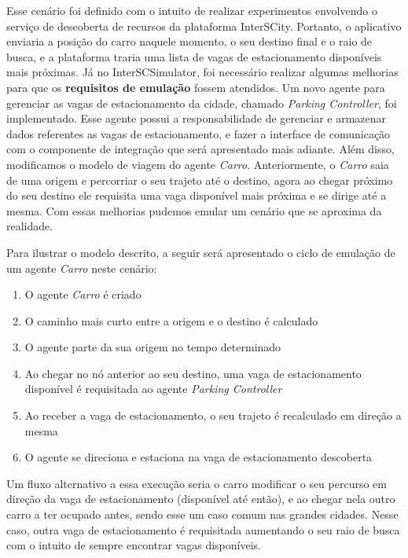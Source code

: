 Esse cenário foi definido com o intuito de realizar experimentos envolvendo o serviço de descoberta de recursos da plataforma InterSCity.
Portanto, o aplicativo enviaria a posição do carro naquele momento, o seu destino final e o raio de busca, e a plataforma traria uma lista de vagas de estacionamento
disponíveis mais próximas.
Já no InterSCSimulator, foi necessário realizar algumas melhorias para que os \textbf{requisitos de emulação} fossem atendidos.
Um novo agente para gerenciar as vagas de estacionamento da cidade, chamado \textit{Parking Controller}, foi implementado.
Esse agente possui a responsabilidade de gerenciar e armazenar dados referentes as vagas de estacionamento, e fazer a interface de comunicação com o componente de
integração que será apresentado mais adiante.
Além disso, modificamos o modelo de viagem do agente \textit{Carro}.
Anteriormente, o \textit{Carro} saia de uma origem e percorriar o seu trajeto até o destino, agora ao chegar próximo do seu destino ele requisita uma vaga disponível mais
próxima e se dirige até a mesma.
Com essas melhorias pudemos emular um cenário que se aproxima da realidade.

Para ilustrar o modelo descrito, a seguir será apresentado o ciclo de emulação de um agente \textit{Carro} neste cenário:

\begin{enumerate}
    \item O agente \textit{Carro} é criado

    \item O caminho mais curto entre a origem e o destino é calculado

    \item O agente parte da sua origem no tempo determinado

    \item Ao chegar no nó anterior ao seu destino, uma vaga de estacionamento disponível é requisitada ao agente \textit{Parking Controller}

    \item Ao receber a vaga de estacionamento, o seu trajeto é recalculado em direção a mesma

    \item O agente se direciona e estaciona na vaga de estacionamento descoberta 
\end{enumerate}

Um fluxo alternativo a essa execução seria o carro modificar o seu percurso em direção da vaga de estacionamento (disponível até então), e ao chegar nela outro
carro a ter ocupado antes, sendo esse um caso comum nas grandes cidades.
Nesse caso, outra vaga de estacionamento é requisitada aumentando o seu raio de busca com o intuito de sempre encontrar vagas disponíveis.

